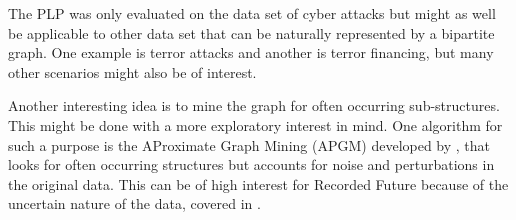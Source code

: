 The PLP was only evaluated on the data set of cyber attacks but might as well be applicable to other data set that can be naturally represented by a bipartite graph. One example is terror attacks and another is terror financing, but many other scenarios might also be of interest.

Another interesting idea is to mine the graph for often occurring sub-structures. This might be done with a more exploratory interest in mind. One algorithm for such a purpose is the AProximate Graph Mining (APGM) developed by \citet{Jia2011}, that looks for often occurring structures but accounts for noise and perturbations in the original data. This can be of high interest for Recorded Future because of the uncertain nature of the data, covered in .
